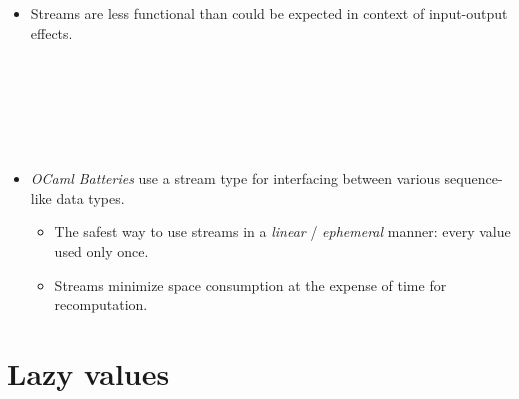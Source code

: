 \documentclass{beamer}
\newcommand{\tmem}[1]{{\em #1\/}}
\newcommand{\tmverbatim}[1]{\text{{\ttfamily{#1}}}}
\begin{document}
\begin{itemize}
  \item Streams are less functional than could be expected in context of
  input-output effects.
  
  {}{}{\hlopt{=}}{\hlendline{}}\\
  {\hlstd{ \ }}{}{}{\hlopt{=
  }}{}{}{\hlendline{}}\\
  {\hlstd{ \ }}{}{}{\hlopt{()
  =}}{\hlendline{}}\\
  {\hlstd{ \ \ \ }}{}{}{\hlopt{(}}{}{\hlopt{,
  }}{}{\hlopt{)}}{\hlendline{}}\\
  {\hlstd{ \ \ \ }}{}{}{\hlopt{->
  }}{}{}{\hlendline{}}\\
  {}{\hlopt{()}}{\hlendline{}}
  
  \item {\tmem{OCaml Batteries}} use a stream type \tmverbatim{enum} for
  interfacing between various sequence-like data types.
  \begin{itemize}
    \item The safest way to use streams in a {\tmem{linear}} /
    {\tmem{ephemeral}} manner: every value used only once.
    
    \item Streams minimize space consumption at the expense of time for
    recomputation.
  \end{itemize}
\end{itemize}

\section{Lazy values}
\end{document}
